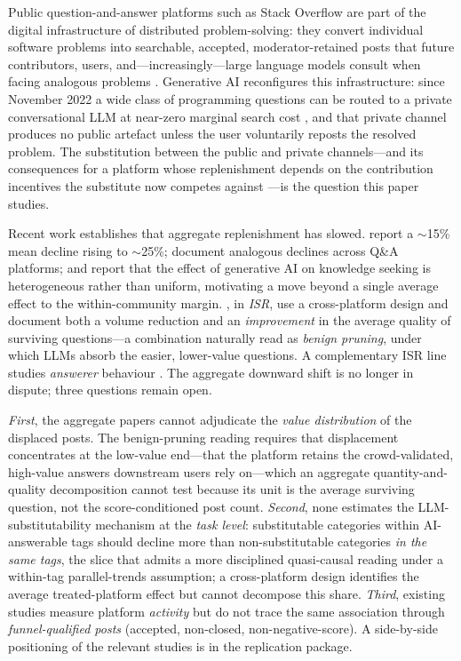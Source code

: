 \label{sec:intro_body}

Public question-and-answer platforms such as Stack Overflow are
part of the digital infrastructure of distributed
problem-solving: they convert individual software problems into
searchable, accepted, moderator-retained posts that future
contributors, users, and---increasingly---large language models
consult when facing analogous problems
\citep{wasko2005faraj,goes2014popularity,nagle2018learning}.
Generative AI reconfigures this infrastructure: since November
2022 a wide class of programming questions can be routed to a
private conversational LLM at near-zero marginal search cost
\citep{eloundou2024gpts,acemoglu2024simple}, and that private
channel produces no public artefact unless the user voluntarily
reposts the resolved problem. The substitution between the public
and private channels---and its consequences for a platform whose
replenishment depends on the contribution incentives the
substitute now competes against
\citep{kankanhalli2005contributing,butler2001membership,benkler2002coase}---is
the question this paper studies.

Recent work establishes that aggregate replenishment has slowed.
\citet{delriochanona2024large} report a $\sim$15\% mean decline
rising to $\sim$25\%; \citet{burtch2024chatgpt} document
analogous declines across Q\&A platforms; and
\citet{quinngutt2024heterogeneous} report that the effect of
generative AI on knowledge seeking is heterogeneous rather than
uniform, motivating a move beyond a single average effect to the
within-community margin. \citet{xue2026chatgpt}, in \emph{ISR},
use a cross-platform design and document both a volume reduction
and an \emph{improvement} in the average quality of surviving
questions---a combination naturally read as \emph{benign
pruning}, under which LLMs absorb the easier, lower-value
questions. A complementary ISR line studies \emph{answerer}
behaviour \citep{shanqiu2026isr}. The aggregate downward shift is
no longer in dispute; three questions remain open.

\emph{First}, the aggregate papers cannot adjudicate the
\emph{value distribution} of the displaced posts. The
benign-pruning reading requires that displacement concentrates at
the low-value end---that the platform retains the crowd-validated,
high-value answers downstream users rely on---which an aggregate
quantity-and-quality decomposition cannot test because its unit is
the average surviving question, not the score-conditioned post
count. \emph{Second}, none estimates the LLM-substitutability
mechanism at the \emph{task level}: substitutable categories
within AI-answerable tags should decline more than
non-substitutable categories \emph{in the same tags}, the slice
that admits a more disciplined quasi-causal reading under a
within-tag parallel-trends assumption; a cross-platform design
identifies the average treated-platform effect but cannot
decompose this share. \emph{Third}, existing studies measure
platform \emph{activity} but do not trace the same association
through \emph{funnel-qualified posts} (accepted, non-closed,
non-negative-score). A side-by-side positioning of the relevant
studies is in the replication package.

